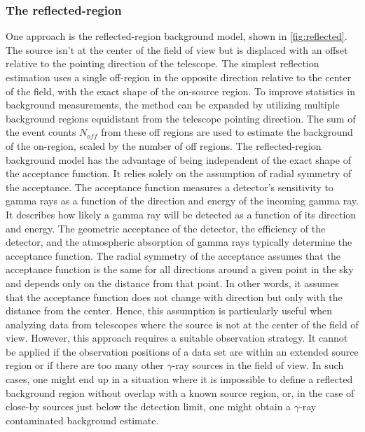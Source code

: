 \subsubsection{The reflected-region}
\label{ss:reflected-region}
One approach is the reflected-region background model, shown in \autoref{fig:reflected}. The source isn't at the center of the field of view but is displaced with an offset relative to the pointing direction of the telescope. The simplest reflection estimation uses a single off-region in the opposite direction relative to the center of the field, with the exact shape of the on-source region. To improve statistics in background measurements, the method can be expanded by utilizing multiple background regions equidistant from the telescope pointing direction. The sum of the event counts $N_{off}$ from these off regions are used to estimate the background of the on-region, scaled by the number of off regions. The reflected-region background model has the advantage of being independent of the exact shape of the acceptance function. It relies solely on the assumption of radial symmetry of the acceptance. The acceptance function measures a detector's sensitivity to gamma rays as a function of the direction and energy of the incoming gamma ray. It describes how likely a gamma ray will be detected as a function of its direction and energy. The geometric acceptance of the detector, the efficiency of the detector, and the atmospheric absorption of gamma rays typically determine the acceptance function. The radial symmetry of the acceptance assumes that the acceptance function is the same for all directions around a given point in the sky and depends only on the distance from that point. In other words, it assumes that the acceptance function does not change with direction but only with the distance from the center. Hence, this assumption is particularly useful when analyzing data from telescopes where the source is not at the center of the field of view. However, this approach requires a suitable observation strategy. It cannot be applied if the observation positions of a data set are within an extended source region or if there are too many other $\gamma$-ray sources in the field of view. In such cases, one might end up in a situation where it is impossible to define a reflected background region without overlap with a known source region, or, in the case of close-by sources just below the detection limit, one might obtain a $\gamma$-ray contaminated background estimate.
